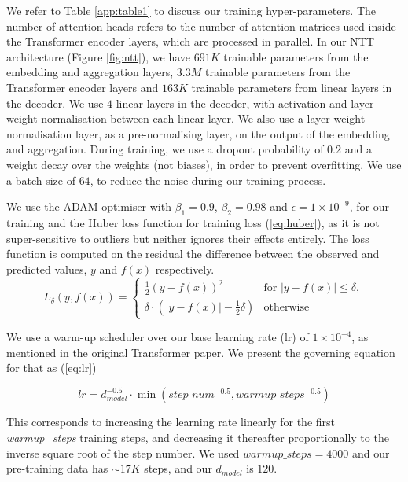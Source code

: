 We refer to Table \ref{app:table1} to discuss our training hyper-parameters. The number of attention heads refers to the number of attention matrices used inside the Transformer encoder layers, which are processed in parallel. In our NTT architecture (Figure \ref{fig:ntt}), we have $691K$ trainable parameters from the embedding and aggregation layers, $3.3M$ trainable parameters from the Transformer encoder layers and $163K$ trainable parameters from linear layers in the decoder. We use $4$ linear layers in the decoder, with activation and layer-weight normalisation\cite{layernorm} between each linear layer.  We also use a layer-weight normalisation layer, as a pre-normalising layer, on the output of the embedding and aggregation. During training, we use a dropout probability\cite{dropout} of $0.2$ and a weight decay\cite{weightdecay} over the weights (not biases)\cite{goodfellowDeepLearning2016}, in order to prevent overfitting. We use a batch size of $64$, to reduce the noise during our training process.

We use the ADAM\cite{adam} optimiser with $\beta_1=0.9$, $\beta_2=0.98$ and $\epsilon=1\times10^{-9}$, for our training and the Huber loss\cite{huber} function for training loss (\ref{eq:huber}), as it is not super-sensitive to outliers but neither ignores their effects entirely. The loss function is computed on the residual \ie the difference between the observed  and predicted values, $y$ and $f(x)$ respectively.
\begin{equation}
L_\delta(y, f(x))=
    \begin{cases}
        \frac{1}{2}(y - f(x))^2 & \text{for } \lvert y - f(x) \rvert \leq \delta, \\
        \delta  \cdot (\lvert y - f(x) \rvert - \frac{1}{2}\delta) & \text{otherwise}
    \end{cases}
\label{eq:huber}
\end{equation}

We use a warm-up scheduler over our base learning rate (lr) of  $1\times10^{-4}$, as mentioned in the original Transformer paper\cite{vaswaniAttentionAllYou2017}. We present the governing equation for that as (\ref {eq:lr})

\begin{equation}
lr = d_{model}^{-0.5} \cdot \min{(step\_num^{-0.5}, warmup\_steps^{-0.5})}
\label{eq:lr}
\end{equation}

This corresponds to increasing the learning rate linearly for the first \emph{warmup\_steps} training steps, and decreasing it thereafter proportionally to the inverse square root of the step number. We used $warmup\_steps = 4000$ and our pre-training data has ${\sim}17K$ steps, and our $d_{model}$ is $120$.


